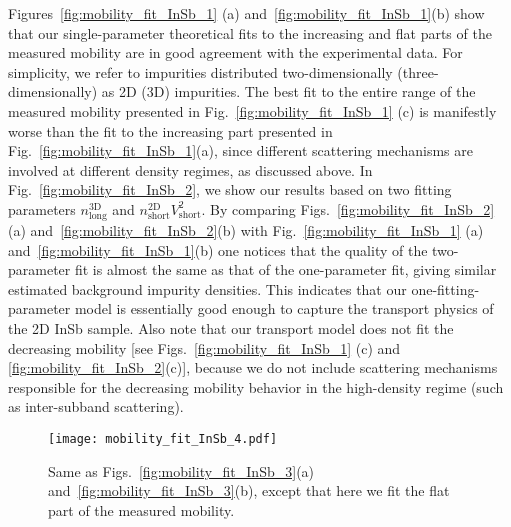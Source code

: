 \documentclass[aps,prmaterials,twocolumn,superscriptaddress,longbibliography]{revtex4-2}
\begin{document}
Figures~\ref{fig:mobility_fit_InSb_1} (a) and~\ref{fig:mobility_fit_InSb_1}(b) show that our single-parameter theoretical fits to the increasing and flat parts of the measured mobility are in good agreement with the experimental data. For simplicity, we refer to impurities distributed two-dimensionally (three-dimensionally) as 2D (3D) impurities. The best fit to the entire range of the measured mobility presented in Fig.~\ref{fig:mobility_fit_InSb_1} (c)  is manifestly worse than the fit to the increasing part presented in Fig.~\ref{fig:mobility_fit_InSb_1}(a), since different scattering mechanisms are involved at different density regimes, as discussed above.
In Fig.~\ref{fig:mobility_fit_InSb_2}, we show our results based on two fitting parameters $n_\mathrm{long}^\mathrm{3D}$ and $n^\mathrm{2D}_\mathrm{short}V^2_\mathrm{short}$. By comparing Figs.~\ref{fig:mobility_fit_InSb_2} (a) and~\ref{fig:mobility_fit_InSb_2}(b) with Fig.~\ref{fig:mobility_fit_InSb_1} (a) and~\ref{fig:mobility_fit_InSb_1}(b) 
one notices that  the quality of the two-parameter fit is almost the same as that of the one-parameter fit, giving similar estimated background impurity densities. This indicates that our one-fitting-parameter model is essentially good enough to capture the transport physics of the 2D InSb sample. Also note that our transport model does not fit the decreasing mobility [see Figs.~\ref{fig:mobility_fit_InSb_1} (c) and \ref{fig:mobility_fit_InSb_2}(c)], because we do not include scattering mechanisms responsible for the decreasing mobility behavior in the high-density regime (such as inter-subband scattering).

  \begin{figure}[!htb]
    \centering
    \texttt{[image: mobility\_fit\_InSb\_4.pdf]}
    \caption{Same as Figs.~\ref{fig:mobility_fit_InSb_3}(a) and~\ref{fig:mobility_fit_InSb_3}(b), except that here we fit the flat part of the measured mobility.}
    \label{fig:mobility_fit_InSb_4}
  \end{figure}
  
\end{document}
